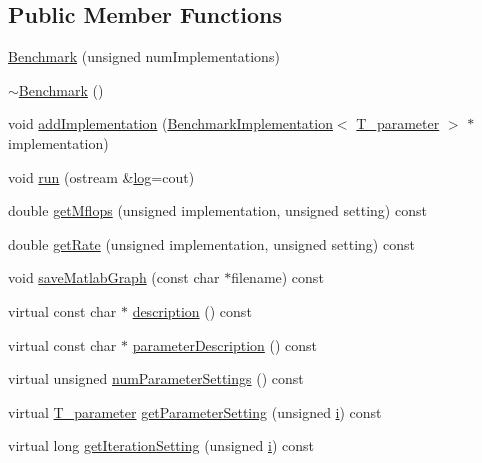 \subsection*{Public Member Functions}
\begin{DoxyCompactItemize}
\item 
\hyperlink{classBenchmark_ac06c9d0abb1d404674a719f1b49a3c28}{Benchmark} (unsigned num\+Implementations)
\item 
\hyperlink{classBenchmark_adf5b1d185837e703437a800221405563}{$\sim$\+Benchmark} ()
\item 
void \hyperlink{classBenchmark_a3fb4caeb423bcf5ad7b1d1a78967e441}{add\+Implementation} (\hyperlink{classBenchmarkImplementation}{Benchmark\+Implementation}$<$ \hyperlink{classBenchmark_a00d2f8bc66032f89f357577c5809fff4}{T\+\_\+parameter} $>$ $\ast$implementation)
\item 
void \hyperlink{classBenchmark_a297e902e8113ac67572ff96804cb619b}{run} (ostream \&\hyperlink{vecuops_8cc_a9744da94c7846c49ff48444fde8d765f}{log}=cout)
\item 
double \hyperlink{classBenchmark_a6f48ee303adf072eec885604454a9ad3}{get\+Mflops} (unsigned implementation, unsigned setting) const 
\item 
double \hyperlink{classBenchmark_ad00794ca6255aeb7289b1c5180215ae4}{get\+Rate} (unsigned implementation, unsigned setting) const 
\item 
void \hyperlink{classBenchmark_a94fb289b470b1787941ccdaaf59d37a1}{save\+Matlab\+Graph} (const char $\ast$filename) const 
\item 
virtual const char $\ast$ \hyperlink{classBenchmark_a17ddd069822b0061527f8f8cb33b6567}{description} () const 
\item 
virtual const char $\ast$ \hyperlink{classBenchmark_a2d15133669884de9bc6669f998a8a45a}{parameter\+Description} () const 
\item 
virtual unsigned \hyperlink{classBenchmark_a1d5919945d5cdc59f8cd216f41552b5f}{num\+Parameter\+Settings} () const 
\item 
virtual \hyperlink{classBenchmark_a00d2f8bc66032f89f357577c5809fff4}{T\+\_\+parameter} \hyperlink{classBenchmark_aef2cec000f1f0e5e6a56a16babea38c8}{get\+Parameter\+Setting} (unsigned \hyperlink{indexexpr_8h_aabd77643995707c185e95c8cb2782c81}{i}) const 
\item 
virtual long \hyperlink{classBenchmark_a713d4972907c5f22c1b23f6a4e2386e2}{get\+Iteration\+Setting} (unsigned \hyperlink{indexexpr_8h_aabd77643995707c185e95c8cb2782c81}{i}) const 
\end{DoxyCompactItemize}


